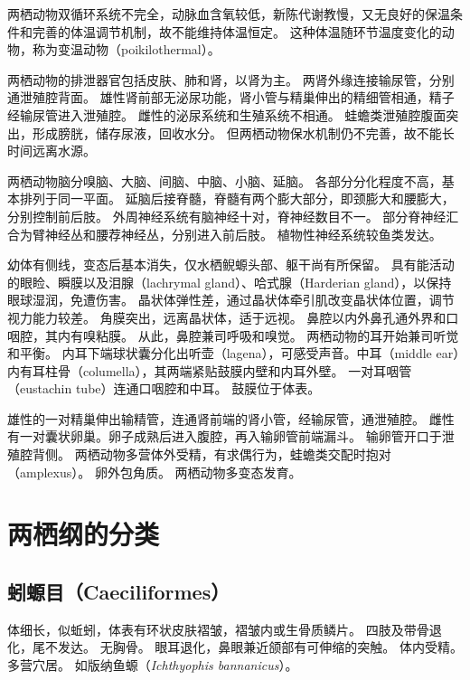 \documentclass[11pt]{article}
\begin{document}
\newline

两栖动物双循环系统不完全，动脉血含氧较低，新陈代谢教慢，又无良好的保温条件和完善的体温调节机制，故不能维持体温恒定。
这种体温随环节温度变化的动物，称为变温动物（poikilothermal）。

\newline

两栖动物的排泄器官包括皮肤、肺和肾，以肾为主。
两肾外缘连接输尿管，分别通泄殖腔背面。
雄性肾前部无泌尿功能，肾小管与精巢伸出的精细管相通，精子经输尿管进入泄殖腔。
雌性的泌尿系统和生殖系统不相通。
蛙蟾类泄殖腔腹面突出，形成膀胱，储存尿液，回收水分。
但两栖动物保水机制仍不完善，故不能长时间远离水源。

\newline

两栖动物脑分嗅脑、大脑、间脑、中脑、小脑、延脑。
各部分分化程度不高，基本排列于同一平面。
延脑后接脊髓，脊髓有两个膨大部分，即颈膨大和腰膨大，分别控制前后肢。
外周神经系统有脑神经十对，脊神经数目不一。
部分脊神经汇合为臂神经丛和腰荐神经丛，分别进入前后肢。
植物性神经系统较鱼类发达。

\newline

幼体有侧线，变态后基本消失，仅水栖鲵螈头部、躯干尚有所保留。
具有能活动的眼睑、瞬膜以及泪腺（lachrymal gland）、哈式腺（Harderian gland），以保持眼球湿润，免遭伤害。
晶状体弹性差，通过晶状体牵引肌改变晶状体位置，调节视力能力较差。
角膜突出，远离晶状体，适于远视。
鼻腔以内外鼻孔通外界和口咽腔，其内有嗅粘膜。
从此，鼻腔兼司呼吸和嗅觉。
两栖动物的耳开始兼司听觉和平衡。
内耳下端球状囊分化出听壶（lagena），可感受声音。中耳（middle ear）内有耳柱骨（columella），其两端紧贴鼓膜内壁和内耳外壁。
一对耳咽管（eustachin tube）连通口咽腔和中耳。
鼓膜位于体表。

\newline

雄性的一对精巢伸出输精管，连通肾前端的肾小管，经输尿管，通泄殖腔。
雌性有一对囊状卵巢。卵子成熟后进入腹腔，再入输卵管前端漏斗。
输卵管开口于泄殖腔背侧。
两栖动物多营体外受精，有求偶行为，蛙蟾类交配时抱对（amplexus）。
卵外包角质。
两栖动物多变态发育。

\section{两栖纲的分类}
\subsection{蚓螈目（Caeciliformes）}
体细长，似蚯蚓，体表有环状皮肤褶皱，褶皱内或生骨质鳞片。
四肢及带骨退化，尾不发达。
无胸骨。
眼耳退化，鼻眼兼近颌部有可伸缩的突触。
体内受精。
多营穴居。
如版纳鱼螈（\textit{Ichthyophis bannanicus}）。
\end{document}
